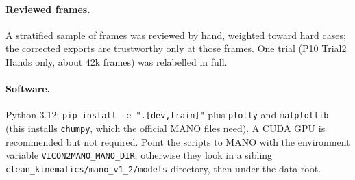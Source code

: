 \documentclass[11pt,a4paper]{article}
\begin{document}
\paragraph{Reviewed frames.} A stratified sample of frames was reviewed by hand, weighted toward hard cases; the
corrected exports are trustworthy only at those frames. One trial (P10 Trial2 Hands only, about 42k frames) was
relabelled in full.

\paragraph{Software.} Python 3.12; \texttt{pip install -e ".[dev,train]"} plus \texttt{plotly} and
\texttt{matplotlib} (this installs \texttt{chumpy}, which the official MANO files need). A CUDA GPU is recommended but not
required. Point the scripts to MANO with the environment variable \texttt{VICON2MANO\_MANO\_DIR}; otherwise they look in
a sibling \texttt{clean\_kinematics/mano\_v1\_2/models} directory, then under the data root.
\end{document}

